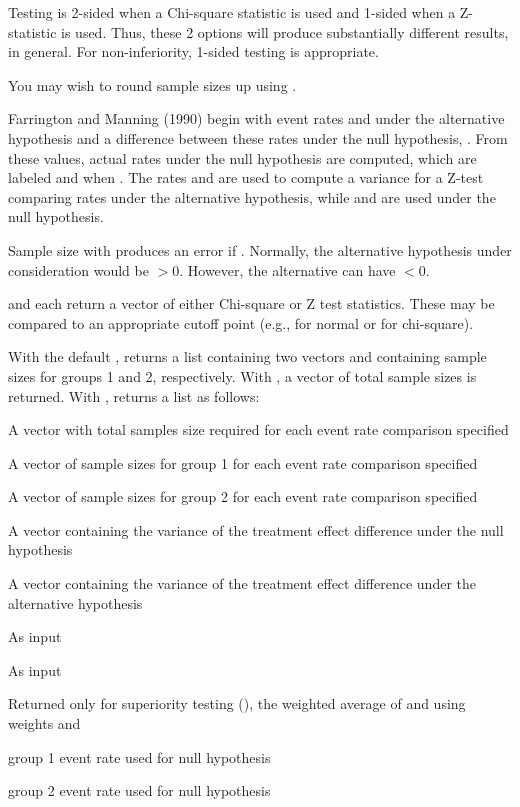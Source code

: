 \begin{Details}\relax
Testing is 2-sided when a Chi-square statistic is used and 1-sided when a Z-statistic is used.
Thus, these 2 options will produce substantially different results, in general.
For non-inferiority, 1-sided testing is appropriate.

You may wish to round sample sizes up using .

Farrington and Manning (1990) begin with event rates  and  under the alternative hypothesis
and a difference between these rates under the null hypothesis, .
From these values, actual rates under the null hypothesis are computed, which are labeled  and  when .
The rates  and  are used to compute a variance for a Z-test comparing rates under the alternative hypothesis,
while  and  are used under the null hypothesis.

Sample size with  produces an error if . 
Normally, the alternative hypothesis under consideration would be $>0$.
However, the alternative can have $<0$.
\end{Details}
\begin{Value}
 and  each return a vector of either Chi-square or Z test statistics. 
These may be compared to an appropriate cutoff point (e.g.,  for normal or  for chi-square).

With the default ,  returns a list containing two vectors  and  containing
sample sizes for groups 1 and 2, respectively.
With , a vector of total sample sizes is returned.
With ,  returns a list as follows:
\begin{ldescription}
\item[\code{n}] A vector with total samples size required for each event rate comparison specified
\item[\code{n1}] A vector of sample sizes for group 1 for each event rate comparison specified
\item[\code{n2}] A vector of sample sizes for group 2 for each event rate comparison specified
\item[\code{sigma0}] A vector containing the variance of the treatment effect difference under the null hypothesis
\item[\code{sigma1}] A vector containing the variance of the treatment effect difference under the alternative hypothesis
\item[\code{p1}] As input
\item[\code{p2}] As input
\item[\code{pbar}] Returned only for superiority testing (), the weighted average of  and  using weights
 and 
\item[\code{p10}] group 1 event rate used for null hypothesis
\item[\code{p20}] group 2 event rate used for null hypothesis
\end{ldescription}
\end{Value}
